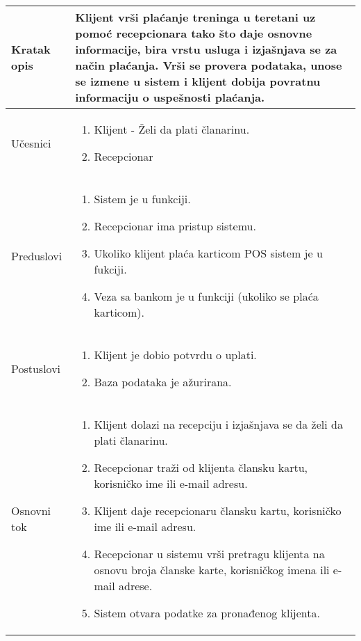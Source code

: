 \documentclass[../main.tex]{subfiles}
\begin{document}
\begin{longtable}{| p{} | p{} |} 

\hline
    Kratak opis &  Klijent vrši plaćanje treninga u teretani uz pomoć recepcionara tako što daje osnovne informacije, bira vrstu usluga i izjašnjava se za način plaćanja. Vrši se provera podataka, unose se izmene u sistem i klijent dobija povratnu informaciju o uspešnosti plaćanja.\\ 
\hline    
    Učesnici & 
    	\begin{enumerate}
        \item Klijent - Želi da plati članarinu. 
        \item Recepcionar
     \end{enumerate}\\
\hline
   Preduslovi & \begin{enumerate}
       \item Sistem je u funkciji.
       \item Recepcionar ima pristup sistemu.
       \item Ukoliko klijent plaća karticom POS sistem je u fukciji.
       \item Veza sa bankom je u funkciji (ukoliko se plaća karticom).	
   \end{enumerate}\\
\hline  
    Postuslovi & \begin{enumerate}
        \item Klijent je dobio potvrdu o uplati.
        \item Baza podataka je ažurirana.
    \end{enumerate}\\
\hline
    Osnovni tok & \begin{enumerate}
        \item Klijent dolazi na recepciju i izjašnjava se da želi da plati članarinu.
        \item Recepcionar traži od klijenta člansku kartu, korisničko ime ili e-mail adresu.	
        \item Klijent daje recepcionaru člansku kartu, korisničko ime ili e-mail adresu.
        \item Recepcionar u sistemu vrši pretragu klijenta na osnovu broja članske karte, korisničkog imena ili e-mail adrese.
        \item Sistem otvara podatke za pronađenog klijenta.

\end{enumerate}
\end{longtable}
\end{document}
